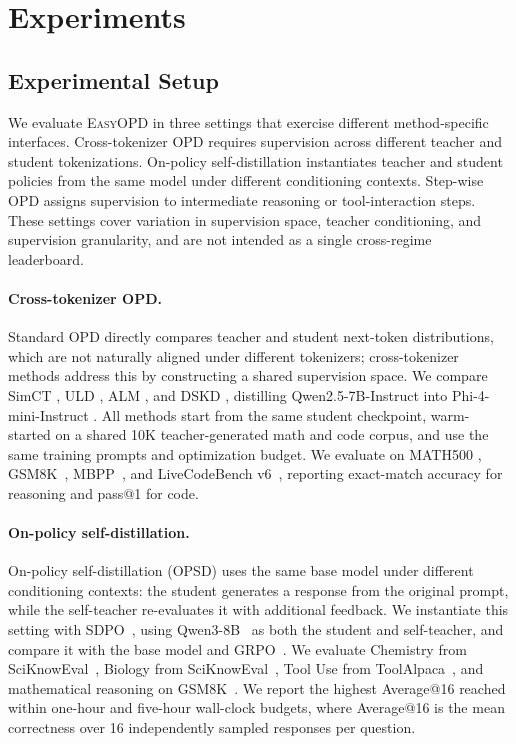 \section{Experiments}
\label{sec:experiments}


\subsection{Experimental Setup}
\label{sec:exp_setup}

We evaluate \textsc{EasyOPD} in three settings that exercise different method-specific interfaces. Cross-tokenizer OPD requires supervision across different teacher and student tokenizations. On-policy self-distillation instantiates teacher and student policies from the same model under different conditioning contexts. Step-wise OPD assigns supervision to intermediate reasoning or tool-interaction steps. These settings cover variation in supervision space, teacher conditioning, and supervision granularity, and are not intended as a single cross-regime leaderboard.

\paragraph{Cross-tokenizer OPD.}
Standard OPD directly compares teacher and student next-token distributions, which are not naturally aligned under different tokenizers; cross-tokenizer methods address this by constructing a shared supervision space. We compare SimCT \citep{sun2026simctrecoveringlostsupervision}, ULD \citep{boizard2025uld}, ALM \citep{minixhofer2025alm}, and DSKD \citep{zhang2024dskd}, distilling Qwen2.5-7B-Instruct \citep{qwen25} into Phi-4-mini-Instruct \citep{phi4mini}. All methods start from the same student checkpoint, warm-started on a shared 10K teacher-generated math and code corpus, and use the same training prompts and optimization budget. We evaluate on MATH500 \citep{lightman2023math500}, GSM8K~\citep{cobbe2021training_gms8k}, MBPP~\citep{austin2021program_mbpp}, and LiveCodeBench v6~\citep{jain2024livecodebench}, reporting exact-match accuracy for reasoning and pass@1 for code.

\paragraph{On-policy self-distillation.}
On-policy self-distillation (OPSD) uses the same base model under different conditioning contexts: the student generates a response from the original prompt, while the self-teacher re-evaluates it with additional feedback. We instantiate this setting with SDPO~\citep{hubotter2026sdpo}, using Qwen3-8B~\citep{qwen2025qwen3} as both the student and self-teacher, and compare it with the base model and GRPO~\citep{shao2024deepseekmath}. We evaluate Chemistry from SciKnowEval~\citep{feng2024sciknoweval}, Biology from SciKnowEval~\citep{feng2024sciknoweval}, Tool Use from ToolAlpaca~\citep{tang2023toolalpaca}, and mathematical reasoning on GSM8K~\citep{cobbe2021training_gms8k}. We report the highest Average@16 reached within one-hour and five-hour wall-clock budgets, where Average@16 is the mean correctness over 16 independently sampled responses per question.

